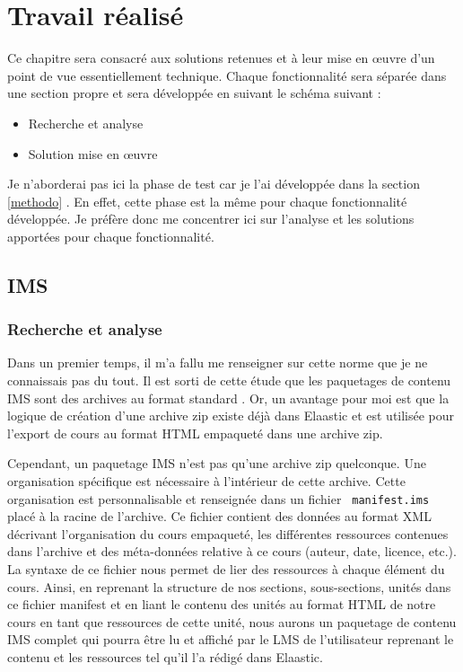 \chapter{Travail réalisé}
Ce chapitre sera consacré aux solutions retenues et à leur mise en \oe uvre d'un
point de vue essentiellement technique. Chaque fonctionnalité sera séparée dans
une section propre et sera développée en suivant le schéma suivant :
\begin{itemize}
  \item Recherche et analyse
  \item Solution mise en \oe uvre
\end{itemize}
\vspace{10px}
Je n'aborderai pas ici la phase de test car je l'ai développée dans la section
\ref{methodo} . En effet, cette phase est la même pour chaque
fonctionnalité développée. Je préfère donc me concentrer ici sur l'analyse et
les solutions apportées pour chaque fonctionnalité.
\section{IMS}
\subsection{Recherche et analyse}
Dans un premier temps, il m'a fallu me renseigner sur cette norme que je ne
connaissais pas du tout. Il est sorti de cette étude que les paquetages de
contenu IMS sont des archives au format standard . Or, un avantage
pour moi est que la logique de création d'une archive zip existe déjà dans
Elaastic et est utilisée pour l'export de cours au format HTML empaqueté dans
une archive zip.

Cependant, un paquetage IMS n'est pas qu'une archive zip quelconque. Une
organisation spécifique est nécessaire à l'intérieur de cette archive. Cette
organisation est personnalisable et renseignée dans un fichier {\tt
manifest.ims} placé à la racine de l'archive. Ce fichier contient des données au
format XML décrivant l'organisation du cours empaqueté, les différentes
ressources contenues dans l'archive et des méta-données relative à ce cours
(auteur, date, licence, etc.). La syntaxe de ce fichier nous permet de lier des
ressources à chaque élément du cours.
Ainsi, en reprenant la structure de nos sections, sous-sections, unités dans ce
fichier manifest et en liant le contenu des unités au format HTML de notre cours
en tant que ressources de cette unité, nous aurons un paquetage de contenu IMS
complet qui pourra être lu et affiché par le LMS de l'utilisateur reprenant le
contenu et les ressources tel qu'il l'a rédigé dans Elaastic.


